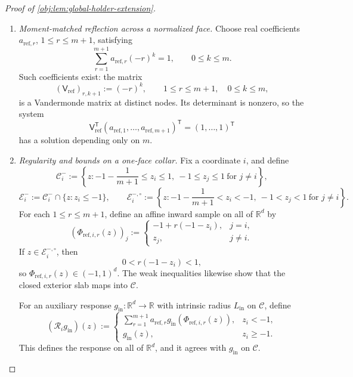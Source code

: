 \documentclass[11pt]{article}
\begin{document}
\begin{proof}[Proof of \cref{obj:lem:global-holder-extension}]
\begin{enumerate}
\item \emph{Moment-matched reflection across a normalized face.}
Choose real coefficients \(a_{\mathrm{ref},r}\), \(1\le r\le m+1\), satisfying
\[
\sum_{r=1}^{m+1}a_{\mathrm{ref},r}(-r)^k=1,
\qquad 0\le k\le m.
\]
Such coefficients exist: the matrix
\[
(\mathsf V_{\mathrm{ref}})_{r,k+1}:=(-r)^k,
\qquad 1\le r\le m+1,\quad 0\le k\le m,
\]
is a Vandermonde matrix at distinct nodes. Its determinant is nonzero, so the system
\[
\mathsf V_{\mathrm{ref}}^{\mathsf T}
(a_{\mathrm{ref},1},\ldots,a_{\mathrm{ref},m+1})^{\mathsf T}
=(1,\ldots,1)^{\mathsf T}
\]
has a solution depending only on \(m\).

\item\label{proof:global-holder-extension:face-collar} \emph{Regularity and bounds on a one-face collar.}
Fix a coordinate \(i\), and define
\[
\mathcal C_i^-:=
\left\{z:
-1-\frac1{m+1}\le z_i\le1,\
-1\le z_j\le1\ \text{for }j\ne i
\right\},
\]
\[
\mathcal E_i^-:=\mathcal C_i^-\cap\{z:z_i\le-1\},
\qquad
\mathcal E_i^{-,\circ}:=
\left\{z:
-1-\frac1{m+1}<z_i<-1,\
-1<z_j<1\ \text{for }j\ne i
\right\}.
\]
For each \(1\le r\le m+1\), define an affine inward sample on all of \(\mathbb R^d\) by
\[
(\Phi_{\mathrm{ref},i,r}(z))_j
:=
\begin{cases}
-1+r(-1-z_i),&j=i,\\
z_j,&j\ne i.
\end{cases}
\]
If \(z\in\mathcal E_i^{-,\circ}\), then
\[
0<r(-1-z_i)<1,
\]
so \(\Phi_{\mathrm{ref},i,r}(z)\in(-1,1)^d\). The weak inequalities likewise show that the closed exterior slab maps into \(\mathcal C\).

For an auxiliary response \(g_{\mathrm{in}}:\mathbb R^d\to\mathbb R\) with intrinsic radius \(L_{\mathrm{in}}\) on \(\mathcal C\), define
\[
(\mathscr R_i g_{\mathrm{in}})(z)
:=
\begin{cases}
\displaystyle\sum_{r=1}^{m+1}
a_{\mathrm{ref},r}g_{\mathrm{in}}(\Phi_{\mathrm{ref},i,r}(z)),
&z_i<-1,\\
g_{\mathrm{in}}(z),&z_i\ge-1.
\end{cases}
\]
This defines the response on all of \(\mathbb R^d\), and it agrees with \(g_{\mathrm{in}}\) on \(\mathcal C\).


\end{enumerate}
\end{proof}
\end{document}
